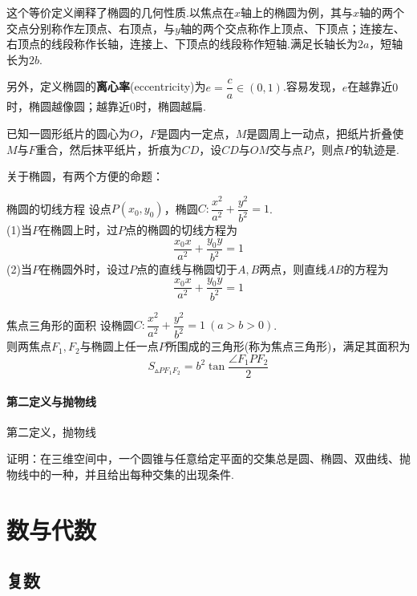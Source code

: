 \documentclass[lang=cn, zihao=4.5]{elegantbook}
\newcommand{\tk}{\uline{\hspace{4em}}}
\begin{document}
这个等价定义阐释了椭圆的几何性质.以焦点在$x$轴上的椭圆为例，其与$x$轴的两个交点分别称作左顶点、右顶点，与$y$轴的两个交点称作上顶点、下顶点；连接左、右顶点的线段称作长轴，连接上、下顶点的线段称作短轴.满足长轴长为$2a$，短轴长为$2b$.

另外，定义椭圆的\textbf{离心率}(eccentricity)为$e=\dfrac{c}{a} \in (0,1)$.容易发现，$e$在越靠近$0$时，椭圆越像圆；越靠近$0$时，椭圆越扁.

\begin{example}
	已知一圆形纸片的圆心为$O$，$F$是圆内一定点，$M$是圆周上一动点，把纸片折叠使$M$与$F$重合，然后抹平纸片，折痕为$CD$，设$CD$与$OM$交与点$P$，则点$P$的轨迹是\tk .
\end{example}


关于椭圆，有两个方便的命题：

\begin{proposition}{椭圆的切线方程}
	设点$P(x_0,y_0)$，椭圆$C:\dfrac{x^2}{a^2}+\dfrac{y^2}{b^2}=1$. \\
	(1)当$P$在椭圆上时，过$P$点的椭圆的切线方程为$$\frac{x_0x}{a^2} + \frac{y_0y}{b^2} = 1$$
	(2)当$P$在椭圆外时，设过$P$点的直线与椭圆切于$A,B$两点，则直线$AB$的方程为$$\frac{x_0x}{a^2} + \frac{y_0y}{b^2} = 1$$
\end{proposition}

\begin{proposition}{焦点三角形的面积}
	设椭圆$C:\dfrac{x^2}{a^2}+\dfrac{y^2}{b^2}=1~(a>b>0)$. \\
	则两焦点$F_1,F_2$与椭圆上任一点$P$所围成的三角形(称为焦点三角形)，满足其面积为$$S_{\vartriangle PF_1F_2} = b^2\tan \frac{\angle F_1PF_2}{2}$$
\end{proposition}



\subsection{第二定义与抛物线}

第二定义，抛物线

\begin{problem}
	证明：在三维空间中，一个圆锥与任意给定平面的交集总是圆、椭圆、双曲线、抛物线中的一种，并且给出每种交集的出现条件.
\end{problem}

\part{数与代数}

\chapter{复数}
\end{document}
